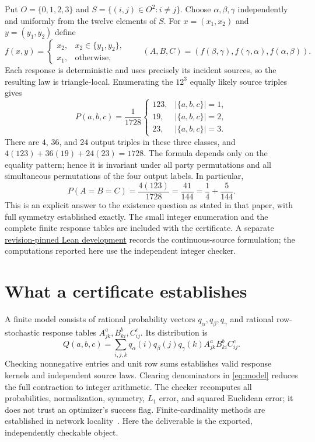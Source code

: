\documentclass[10pt]{article}
\begin{document}
Put $O=\{0,1,2,3\}$ and $S=\{(i,j)\in O^2:i\ne j\}$. Choose
$\alpha,\beta,\gamma$ independently and uniformly from the twelve elements of
$S$. For $x=(x_1,x_2)$ and $y=(y_1,y_2)$ define
\[
 f(x,y)=\begin{cases}x_2,&x_2\in\{y_1,y_2\},\\x_1,&\text{otherwise},\end{cases}
 \qquad (A,B,C)=(f(\beta,\gamma),f(\gamma,\alpha),f(\alpha,\beta)).
\]
Each response is deterministic and uses precisely its incident sources, so
the resulting law is triangle-local. Enumerating the $12^3$ equally likely
source triples gives
\begin{equation}
 P(a,b,c)=\frac1{1728}
 \begin{cases}
 123,&|\{a,b,c\}|=1,\\
 19,&|\{a,b,c\}|=2,\\
 23,&|\{a,b,c\}|=3.
 \end{cases}\label{eq:symmetric}
\end{equation}
There are $4$, $36$, and $24$ output triples in these three classes, and
$4(123)+36(19)+24(23)=1728$. The formula depends only on the equality pattern;
hence it is invariant under all party permutations and all simultaneous
permutations of the four output labels. In particular,
\[
 P(A=B=C)=\frac{4(123)}{1728}=\frac{41}{144}=\frac14+\frac5{144}.
\]
This is an explicit answer to the existence question as stated in that paper,
with full symmetry established exactly.
The small integer enumeration and the complete finite response tables are
included with the certificate. A separate
\href{https://github.com/the-omega-institute/trureturing/blob/59c09d64d1050c396df54b58b4f410f09f0c25d0/D5/S3/Quantum/Entanglement/TriangleSymmetricLocalRefutation.lean}{revision-pinned Lean development}
records the continuous-source formulation; the computations reported here use
the independent integer checker.

\newpage
\section{What a certificate establishes}
A finite model consists of rational probability vectors $q_\alpha,q_\beta,
q_\gamma$ and rational row-stochastic response tables $A_{jk}^a,B_{ki}^b,C_{ij}^c$.
Its distribution is
\begin{equation}
 Q(a,b,c)=\sum_{i,j,k}q_\alpha(i)q_\beta(j)q_\gamma(k)
 A_{jk}^a B_{ki}^b C_{ij}^c.\label{eq:model}
\end{equation}
Checking nonnegative entries and unit row sums establishes valid response
kernels and independent source laws. Clearing denominators in
\eqref{eq:model} reduces the full contraction to integer arithmetic. The
checker recomputes all probabilities, normalization, symmetry, $L_1$ error,
and squared Euclidean error; it does not trust an optimizer's success flag.
Finite-cardinality methods are established in network locality~\cite{rosset,dasilva}.
Here the deliverable is the exported, independently checkable object.
\end{document}
